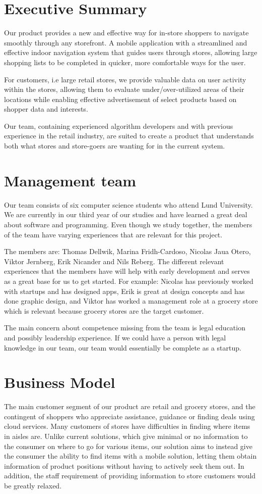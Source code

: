 \documentclass[titlepage]{article}
\begin{document}
\section{Executive Summary}
Our product provides a new and effective way for in-store shoppers to navigate smoothly through any storefront. A mobile application with a streamlined and effective indoor navigation system that guides users through stores, allowing large shopping lists to be completed in quicker, more comfortable ways for the user. 

For customers, i.e large retail stores, we provide valuable data on user activity within the stores, allowing them to evaluate under/over-utilized areas of their locations while enabling effective advertisement of select products based on shopper data and interests. 

Our team, containing experienced algorithm developers and with previous experience in the retail industry, are suited to create a product that understands both what stores and store-goers are wanting for in the current system.

\section{Management team}
Our team consists of six computer science students who attend Lund University. We are currently in our third year of our studies and have learned a great deal about software and programming. Even though we study together, the members of the team have varying experiences that are relevant for this project.

The members are: Thomas Dellwik, Marina Fridh-Cardoso, Nicolas Jaua Otero, Viktor Jernberg, Erik Nicander and Nils Reberg. The different relevant experiences that the members have will help with early development and serves as a great base for us to get started. For example: Nicolas has previously worked with startups and has designed apps, Erik is great at design concepts and has done graphic design, and Viktor has worked a management role at a grocery store which is relevant because grocery stores are the target customer.

The main concern about competence missing from the team  is legal education and possibly leadership experience. If we could have a person with legal knowledge in our team, our team would essentially be complete as a startup.

\section{Business Model}
The main customer segment of our product are retail and grocery stores, and the contingent of shoppers who appreciate assistance, 
guidance or finding deals using cloud services. 
Many customers of stores have difficulties in finding where items in aisles are.
Unlike current solutions, which give minimal or no information to the consumer on where to go for various items,
our solution aims to instead give the consumer the ability to find items with a mobile solution,
letting them obtain information of product positions without having to actively seek them out.
In addition, the staff requirement of providing information to store customers would be greatly relaxed.
\end{document}
